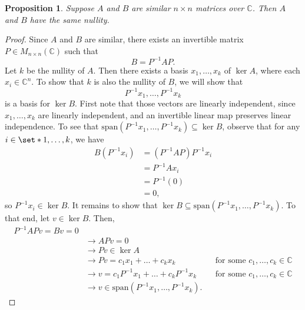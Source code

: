 \documentclass[12pt]{article}
\newtheorem{prop}[thm]{Proposition}
\theoremstyle{definition}
\newcommand{\C}{\mathbb C}
\begin{document}
\begin{prop}\label{similar matrices have same nullity}
Suppose $A$ and $B$ are similar $n \times n$ matrices over $\C$. Then $A$ and $B$ have the same nullity.
\end{prop}
\begin{proof}
Since $A$ and $B$ are similar, there exists an invertible matrix $P \in M_{n \times n}(\C)$ such that $$B = P^{-1} A P.$$ Let $k$ be the nullity of $A$. Then there exists a basis $x_1, \dots, x_k$ of $\ker A$, where each $x_i \in \C^n$. To show that $k$ is also the nullity of $B$, we will show that 
$$P^{-1}x_1, \dots, P^{-1}x_k$$
is a basis for $\ker B$. First note that those vectors are linearly independent, since $x_1, \dots, x_k$ are linearly independent, and an invertible linear map preserves linear independence. To see that $\text{span} (P^{-1}x_1, \dots, P^{-1}x_k) \subseteq \ker B$, observe that for any $i \in \set*{1, \dots, k}$, we have
\begin{align*}
B(P^{-1}x_i)
&= (P^{-1}AP)P^{-1}x_i \\
&= P^{-1} A x_i \\
&= P^{-1} (0) \\
&= 0,
\end{align*}
so $P^{-1}x_i \in \ker B$. It remains to show that $\ker B \subseteq \text{span} (P^{-1}x_1, \dots, P^{-1}x_k)$. To that end, let $v \in \ker B$. Then,
\begin{align*}
P^{-1}AP v = B v = 0 \\
&\rightarrow AP v = 0 \\
&\rightarrow Pv \in \ker A \\
&\rightarrow Pv = c_1 x_1 + \dots + c_k x_k &&\text{for some $c_1, \dots, c_k \in \C$} \\
&\rightarrow v = c_1 P^{-1} x_1 + \dots + c_k P^{-1} x_k &&\text{for some $c_1, \dots, c_k \in \C$} \\
&\rightarrow v \in \text{span} (P^{-1}x_1, \dots, P^{-1}x_k).
\end{align*} 
\end{proof}
\end{document}
